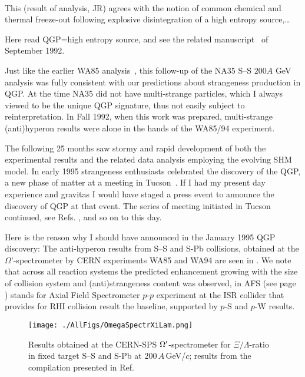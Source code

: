 \\[-0.7cm]
%
\begin{mdframed}[linecolor=gray,roundcorner=12pt,backgroundcolor=Dandelion!15,linewidth=1pt,leftmargin=0cm,rightmargin=0cm,topline=true,bottomline=true,skipabove=12pt]
\relax
%
This (result of analysis, JR) agrees with the notion of common chemical and thermal freeze-out following explosive disintegration of a high entropy source,\ldots
%
\end{mdframed}
Here read QGP=high entropy source, and see the related manuscript~\cite{Letessier:1992xd} of September 1992.

Just like the earlier WA85 analysis~\cite{Rafelski:1991rh}, this follow-up of the NA35 S--S $200 A$ GeV analysis was fully consistent with our predictions about strangeness production in QGP. At the time NA35 did not have multi-strange particles, which I always viewed to be the unique QGP signature, thus not easily subject to reinterpretation. In Fall 1992, when this work was prepared, multi-strange (anti)hyperon results were alone in the hands of the WA85/94 experiment. 

The following 25 months saw stormy and rapid development of both the experimental results and the related data analysis employing the evolving SHM model. In early 1995 strangeness enthusiasts celebrated the discovery of the QGP, a new phase of matter at a meeting in Tucson~\cite{Rafelski:1995zq}. If I had my present day experience and gravitas I would have staged a press event to announce the discovery of QGP at that event. The series of meeting initiated in Tucson continued, see Refs. \cite{Rafelski:1995zq,S96,SQM97}, and so on to this day.

Here is the reason why I should have announced in the January 1995 QGP discovery:\label{SQM95an} The anti-hyperon results from S--S and S-Pb collisions, obtained at the $\Omega$\rq-spectro\-meter by CERN experiments WA85 and WA94 are seen in . We note that across all reaction systems the predicted enhancement growing with the size of collision system and (anti)strangeness content was observed, in  AFS (see page \pageref{AFSexp}) stands for Axial Field Spectrometer $p$-$p$ experiment at the ISR collider that provides for RHI collision result the baseline, supported by $p$-S and $p$-W results. 

\begin{figure}[tb]\sidecaption
\texttt{[image: ./AllFigs/OmegaSpectrXiLam.png]}
\caption{Results obtained at the CERN-SPS $\Omega\rq$-spectrometer for $\Xi/\Lambda$-ratio in fixed target S--S and S-Pb at 200\,$A$\,GeV/$c$; results from the compilation presented in Ref.\cite{Omega25y}}\label{SigLamCERNFig}
\end{figure}


